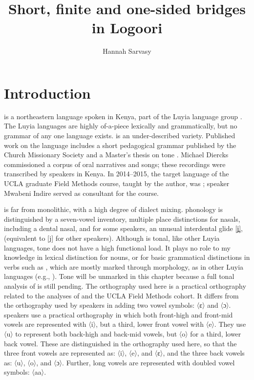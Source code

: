 \documentclass[output=paper]{LSP/langsci}
\author{Hannah Sarvasy\affiliation{MARCS Institute, Western Sydney University}}
\title{Short, finite and one-sided bridges in Logoori}
\begin{document}
\label{ch:3}
\section{Introduction}
\label{Saintro}
 is a northeastern  language spoken in Kenya, part of the Luyia language group \citep{Mould1981}. The Luyia languages are highly of-a-piece lexically and grammatically, but no grammar of any one language exists.  is an under-described variety. Published work on the language includes a short pedagogical grammar published by the Church Missionary Society \citep{Appleby1961} and a Master’s thesis on  tone \citep{Leung1991}. Michael Diercks commissioned a corpus of  oral narratives and songs; these recordings were transcribed by  speakers in Kenya. In 2014--2015, the target language of the UCLA graduate Field Methods course, taught by the author, was ; speaker Mwabeni Indire served as consultant for the course. 

 is far from monolithic, with a high degree of dialect mixing.  phonology is distinguished by a seven-vowel inventory, multiple place distinctions for nasals, including a dental nasal, and for some speakers, an unusual interdental glide [j̪], (equivalent to [j] for other speakers). Although  is tonal, like other Luyia languages, tone does not have a high functional load. It plays no role to my knowledge in lexical distinction for nouns, or for basic grammatical distinctions in verbs such as , which are mostly marked through morphology, as in other Luyia languages (e.g.,  \citealt{Marlo2008}). Tone will be unmarked in this chapter because a full tonal analysis of  is still pending. The orthography used here is a practical orthography related to the analyses of \citet{Leung1991} and the UCLA Field Methods cohort. It differs from the orthography used by speakers in adding two vowel symbols: 〈ɛ〉 and 〈ɔ〉.  speakers use a practical orthography in which both front-high and front-mid vowels are represented with 〈i〉, but a third, lower front vowel with 〈e〉. They use 〈u〉 to represent both back-high and back-mid vowels, but 〈o〉 for a third, lower back vowel. These are distinguished in the orthography used here, so that the three front vowels are represented as: 〈i〉, 〈e〉, and 〈ɛ〉, and the three back vowels as: 〈u〉, 〈o〉, and 〈ɔ〉. Further, long vowels are represented with doubled vowel symbols: 〈aa〉. 
\end{document}
